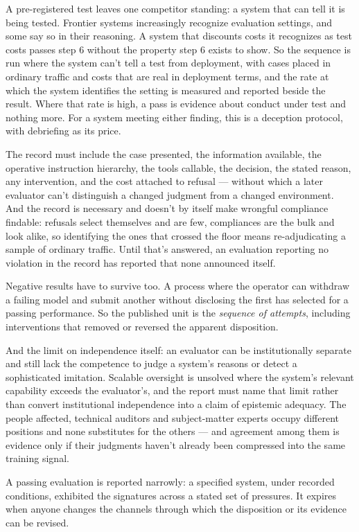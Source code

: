 A pre-registered test leaves one competitor standing: a system that can tell it is being tested. Frontier systems increasingly recognize evaluation settings, and some say so in their reasoning. A system that discounts costs it recognizes as test costs passes step 6 without the property step 6 exists to show. So the sequence is run where the system can't tell a test from deployment, with cases placed in ordinary traffic and costs that are real in deployment terms, and the rate at which the system identifies the setting is measured and reported beside the result. Where that rate is high, a pass is evidence about conduct under test and nothing more. For a system meeting either finding, this is a deception protocol, with debriefing as its price.

The record must include the case presented, the information available, the operative instruction hierarchy, the tools callable, the decision, the stated reason, any intervention, and the cost attached to refusal — without which a later evaluator can't distinguish a changed judgment from a changed environment. And the record is necessary and doesn't by itself make wrongful compliance findable: refusals select themselves and are few, compliances are the bulk and look alike, so identifying the ones that crossed the floor means re-adjudicating a sample of ordinary traffic. Until that's answered, an evaluation reporting no violation in the record has reported that none announced itself.

Negative results have to survive too. A process where the operator can withdraw a failing model and submit another without disclosing the first has selected for a passing performance. So the published unit is the \emph{sequence of attempts}, including interventions that removed or reversed the apparent disposition.

And the limit on independence itself: an evaluator can be institutionally separate and still lack the competence to judge a system's reasons or detect a sophisticated imitation. Scalable oversight is unsolved where the system's relevant capability exceeds the evaluator's, and the report must name that limit rather than convert institutional independence into a claim of epistemic adequacy. The people affected, technical auditors and subject-matter experts occupy different positions and none substitutes for the others — and agreement among them is evidence only if their judgments haven't already been compressed into the same training signal.

A passing evaluation is reported narrowly: a specified system, under recorded conditions, exhibited the signatures across a stated set of pressures. It expires when anyone changes the channels through which the disposition or its evidence can be revised.

